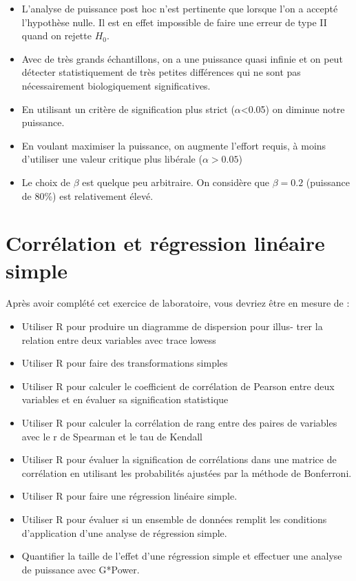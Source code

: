 \documentclass[
  12pt,
]{book}
\providecommand{\tightlist}{%
  \setlength{\itemsep}{0pt}\setlength{\parskip}{0pt}}
\begin{document}
\begin{itemize}
\tightlist
\item
  L'analyse de puissance post hoc n'est pertinente que lorsque l'on a accepté l'hypothèse nulle.
  Il est en effet impossible de faire une erreur de type II quand on rejette \(H_0\).
\item
  Avec de très grands échantillons, on a une puissance quasi infinie et on peut détecter statistiquement de très petites différences qui ne sont pas nécessairement biologiquement significatives.
\item
  En utilisant un critère de signification plus strict (\(\alpha\)\textless0.05) on diminue notre puissance.
\item
  En voulant maximiser la puissance, on augmente l'effort requis, à moins d'utiliser une valeur critique plus libérale (\(\alpha>0.05\))
\item
  Le choix de \(\beta\) est quelque peu arbitraire.
  On considère que \(\beta=0.2\) (puissance de 80\%) est relativement élevé.
\end{itemize}

\hypertarget{corruxe9lation-et-ruxe9gression-linuxe9aire-simple}{%
\chapter{Corrélation et régression linéaire simple}\label{corruxe9lation-et-ruxe9gression-linuxe9aire-simple}}

Après avoir complété cet exercice de laboratoire, vous devriez être en mesure de :

\begin{itemize}
\tightlist
\item
  Utiliser R pour produire un diagramme de dispersion pour illus-
  trer la relation entre deux variables avec trace lowess
\item
  Utiliser R pour faire des transformations simples
\item
  Utiliser R pour calculer le coefficient de corrélation de Pearson entre deux variables et en évaluer sa signification statistique
\item
  Utiliser R pour calculer la corrélation de rang entre des paires de variables avec le r de Spearman et le tau de Kendall
\item
  Utiliser R pour évaluer la signification de corrélations dans une matrice de corrélation en utilisant les probabilités ajustées par la méthode de Bonferroni.
\item
  Utiliser R pour faire une régression linéaire simple.
\item
  Utiliser R pour évaluer si un ensemble de données remplit les conditions d'application d'une analyse de régression simple.
\item
  Quantifier la taille de l'effet d'une régression simple et effectuer une analyse de puissance avec G*Power.
\end{itemize}
\end{document}
